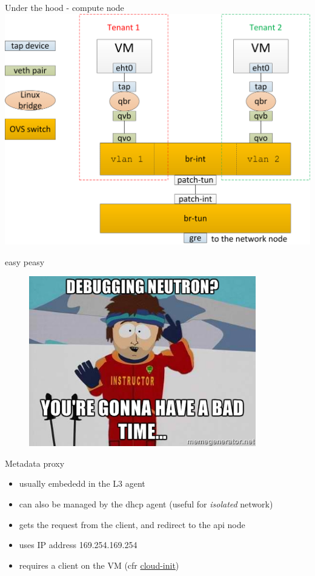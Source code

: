 \documentclass[english,serif,mathserif,xcolor=pdftex,dvipsnames,table]{beamer}
\begin{document}
\begin{frame}
  {Under the hood - compute node}
  \includegraphics[width=\linewidth]{under-the-hood-compute}
\end{frame}

\begin{frame}
  {easy peasy}
  \begin{figure}[ht]
    \centering
    \includegraphics[height=20em]{badtime.jpg}
  \end{figure}
\end{frame}

\begin{frame}
  {Metadata proxy}

  \begin{itemize}
  \item usually embededd in the L3 agent

  \item can also be managed by the dhcp agent (useful for \textit{isolated} network)

  \item gets the request from the client, and redirect to the api node

  \item uses IP address 169.254.169.254
  \item requires a client on the VM (cfr \href{https://launchpad.net/cloud-init}{cloud-init})

  \end{itemize}
\end{frame}
\end{document}
